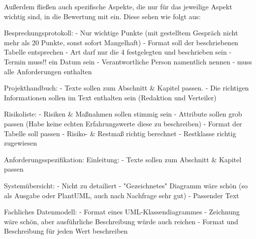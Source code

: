 





Außerdem fließen auch spezifische Aspekte, die nur für das jeweilige Aspekt wichtig sind, in die Bewertung mit ein. 
Diese sehen wie folgt aus:

Besprechungsprotokoll:
- Nur wichtige Punkte (mit gestelltem Gespräch nicht mehr als 20 Punkte, sonst sofort Mangelhaft)
- Format soll der beschriebenen Tabelle entsprechen
- Art darf nur die 4 festgelegten und beschrieben sein
- Termin muss!! ein Datum sein
- Verantwortliche Person namentlich nennen
- muss alle Anforderungen enthalten

Projekthandbuch:
- Texte sollen zum Abschnitt \& Kapitel passen.
- Die richtigen Informationen sollen im Text enthalten sein (Redaktion und Verteiler)

Risikoliste:
- Risiken \& Maßnahmen sollen stimmig sein
- Attribute sollen grob passen (Habe keine echten Erfahrungswerte diese zu beschreiben)
- Format der Tabelle soll passen
- Risiko- \& Restmaß richtig berechnet
- Restklasse richtig zugewiesen

Anforderungsspezifikation:
    Einleitung:
    - Texte sollen zum Abschnitt \&  Kapitel passen

    Systemübersicht:
    - Nicht zu detailiert
    - "Gezeichnetes" Diagramm wäre schön (so als Ausgabe oder PlantUML, auch nach Nachfrage sehr gut)
    - Passender Text

    Fachliches Datenmodell:
    - Format eines UML-Klassendiagrammes
    - Zeichnung wäre schön, aber ausführliche Beschreibung würde auch reichen
    - Format und Beschreibung für jeden Wert beschreiben

